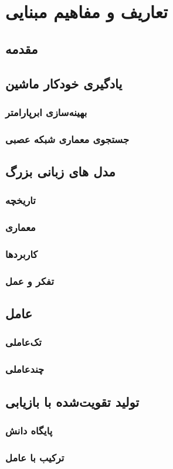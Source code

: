 \chapter{تعاریف و مفاهیم مبنایی }
\thispagestyle{empty}
\section{مقدمه}

\section{یادگیری خودکار ماشین}
\subsection{بهینه‌سازی ابرپارامتر}
\subsection{جستجوی معماری شبکه عصبی}
\section{مدل های زبانی بزرگ}
\subsection{تاریخچه}
\subsection{معماری}
\subsection{کاربردها}
\subsection{تفکر و عمل}
\cite{yao2023react}
\section{عامل}
\subsection{تک‌عاملی}
\subsection{چندعاملی}
\section{تولید تقویت‌شده با بازیابی}
\cite{Lewis2020RAG}
\cite{xia2025ragselfreasoning}
\subsection{پایگاه دانش}
\subsection{ترکیب با عامل}
\cite{singh2025agenticrag}


